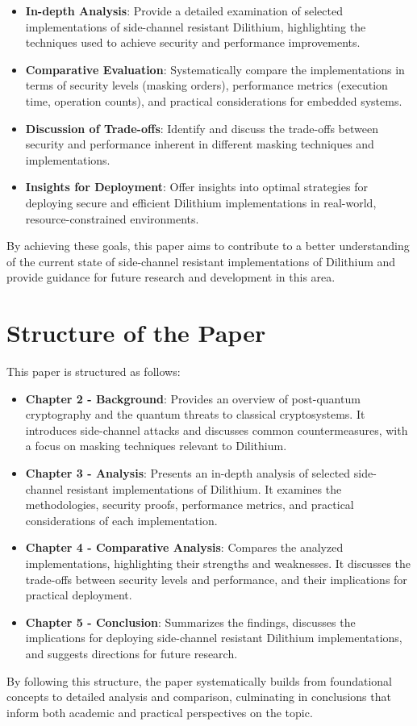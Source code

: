 \begin{itemize}
    \item \textbf{In-depth Analysis}: Provide a detailed examination of selected implementations of side-channel resistant Dilithium, highlighting the techniques used to achieve security and performance improvements.
    \item \textbf{Comparative Evaluation}: Systematically compare the implementations in terms of security levels (masking orders), performance metrics (execution time, operation counts), and practical considerations for embedded systems.
    \item \textbf{Discussion of Trade-offs}: Identify and discuss the trade-offs between security and performance inherent in different masking techniques and implementations.
    \item \textbf{Insights for Deployment}: Offer insights into optimal strategies for deploying secure and efficient Dilithium implementations in real-world, resource-constrained environments.
\end{itemize}

By achieving these goals, this paper aims to contribute to a better understanding of the current state of side-channel resistant implementations of Dilithium and provide guidance for future research and development in this area.

\section{Structure of the Paper}

This paper is structured as follows:

\begin{itemize}
    \item \textbf{Chapter 2 - Background}: Provides an overview of post-quantum cryptography and the quantum threats to classical cryptosystems. It introduces side-channel attacks and discusses common countermeasures, with a focus on masking techniques relevant to Dilithium.
    \item \textbf{Chapter 3 - Analysis}: Presents an in-depth analysis of selected side-channel resistant implementations of Dilithium. It examines the methodologies, security proofs, performance metrics, and practical considerations of each implementation.
    \item \textbf{Chapter 4 - Comparative Analysis}: Compares the analyzed implementations, highlighting their strengths and weaknesses. It discusses the trade-offs between security levels and performance, and their implications for practical deployment.
    \item \textbf{Chapter 5 - Conclusion}: Summarizes the findings, discusses the implications for deploying side-channel resistant Dilithium implementations, and suggests directions for future research.
\end{itemize}

By following this structure, the paper systematically builds from foundational concepts to detailed analysis and comparison, culminating in conclusions that inform both academic and practical perspectives on the topic.

